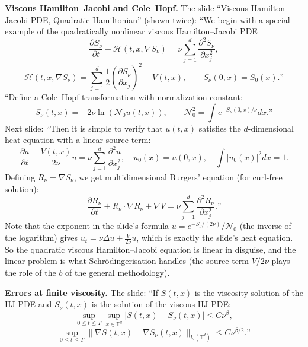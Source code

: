 \medskip\noindent
{\bf Viscous Hamilton--Jacobi and
Cole--Hopf.}
The slide ``Viscous Hamilton--Jacobi PDE,
Quadratic Hamiltonian'' (shown twice):
``We begin with a special example of the
quadratically nonlinear viscous
Hamilton--Jacobi PDE
$$
\frac{\partial S_\nu}{\partial t}
+\mathcal{H}(t,x,\nabla S_\nu)
=\nu\sum_{j=1}^d\frac{\partial^2S_\nu}
{\partial x_j^2},
$$
$$
\mathcal{H}(t,x,\nabla S_\nu)
=\sum_{j=1}^d\frac12\left(\frac{\partial
S_\nu}{\partial x_j}\right)^2+V(t,x),
\qquad
S_\nu(0,x)=S_0(x).\text{''}
$$
``Define a Cole--Hopf transformation with
normalization constant:
$$
S_\nu(t,x)=-2\nu\ln(\mathcal{N}_0u(t,x)),
\qquad
\mathcal{N}_0^2=\int e^{-S_\nu(0,x)/\nu}dx.
\text{''}
$$
Next slide: ``Then it is simple to verify
that $u(t,x)$ satisfies the $d$-dimensional
heat equation with a linear source term:
$$
\frac{\partial u}{\partial t}
-\frac{V(t,x)}{2\nu}u
=\nu\sum_{j=1}^d\frac{\partial^2u}
{\partial x_j^2},
\quad
u_0(x)=u(0,x),
\quad
\int|u_0(x)|^2dx=1.
$$
Defining $R_\nu=\nabla S_\nu$, we get
multidimensional Burgers' equation (for
curl-free solution):
$$
\frac{\partial R_\nu}{\partial t}
+R_\nu\cdot\nabla R_\nu+\nabla V
=\nu\sum_{j=1}^d\frac{\partial^2R_\nu}
{\partial x_j^2}.\text{''}
$$
Note that the exponent in the slide's formula
$u=e^{-S_\nu/(2\nu)}/\mathcal{N}_0$ (the
inverse of the logarithm) gives
$u_t=\nu\Delta u+\frac{V}{2\nu}u$, which is
exactly the slide's heat equation. So the
quadratic viscous Hamilton--Jacobi equation is
linear in disguise, and the linear problem is
what Schr\"odingerisation handles (the
source term $V/2\nu$ plays the role of the
$b$ of the general methodology).

\medskip\noindent
{\bf Errors at finite viscosity.}
The slide: ``If $S(t,x)$ is the viscosity
solution of the HJ PDE and $S_\nu(t,x)$ is the
solution of the viscous HJ PDE:
$$
\sup_{0\le t\le T}\sup_{x\in\mathbb{T}^d}
|S(t,x)-S_\nu(t,x)|\le C\nu^\beta,
$$
$$
\sup_{0\le t\le T}\|\nabla S(t,x)
-\nabla S_\nu(t,x)\|_{l_2(\mathbb{T}^d)}
\le C\nu^{\beta/2}.\text{''}
$$

